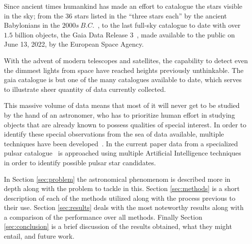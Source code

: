 Since ancient times humankind has made an effort to catalogue the stars visible
in the sky; from the $36$ stars listed in the ``three stars each'' by the
ancient Babylonians in the $2000s\ B.C.$~\cite{astronomy:history:north}, to the
last full-sky catalogue to date with over $1.5$ billion objects, the Gaia Data
Release 3~\cite{gaia:dr3:esa}, made available to the public on June 13, 2022, by
the European Space Agency.

With the advent of modern telescopes and satellites, the capability to detect
even the dimmest lights from space have reached heights previously unthinkable.
The gaia catalogue is but one of the many catalogues available to date, which
serves to illustrate sheer quantity of data currently collected. 

This massive volume of data means that most of it will never get to be studied
by the hand of an astronomer, who has to prioritize human effort in
studying objects that are already known to possess qualities of special interest.
In order to identify these special observations from the sea of data available,
multiple techniques have been developed~\cite{pulsar:dataset:explanation:lyon}.
In the current paper data from a specialized pulsar
catalogue~\cite{pulsar:dataset:lyon} is approached using multiple Artificial
Intelligence techniques in order to identify possible pulsar star candidates.

In Section \ref{sec:problem} the astronomical phenomenom is described more in
depth along with the problem to tackle in this. Section \ref{sec:methods} is a
short description of each of the methods utilized along with the process
previous to their use. Section \ref{sec:results} deals with the most noteworthy
results along with a comparison of the performance over all methods. Finally
Section \ref{sec:conclusion} is a brief discussion of the results obtained, what
they might entail, and future work.